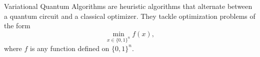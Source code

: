 Variational Quantum Algorithms are heuristic algorithms that alternate between a quantum circuit and a classical optimizer. They tackle optimization problems of the form
$$
\min _{x \in\{0,1\}^n} f(x),
$$
where $f$ is any function defined on $\{0,1\}^n$. 



